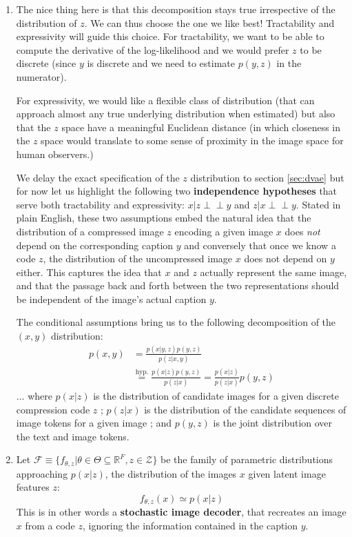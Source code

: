 \documentclass{article}
\begin{document}
\begin{multicols}{2}
\begin{enumerate}
    \item The nice thing here is that this decomposition stays true irrespective of the distribution of $z$.
    We can thus choose the one we like best!
    Tractability and expressivity will guide this choice. For tractability, we want to be able to compute the derivative of the log-likelihood and we would prefer $z$ to be discrete (since $y$ is discrete and we need to estimate $p(y,z)$ in the numerator).
    
    For expressivity, we would like a flexible class of distribution (that can approach almost any true underlying distribution when estimated) but also that the $z$ space have a meaningful Euclidean distance (in which closeness in the $z$ space would translate to some sense of proximity in the image space for human observers.)
    
    We delay the exact specification of the $z$ distribution to section \ref{sec:dvae} but for now let us highlight the following two \textbf{independence hypotheses} that serve both tractability and expressivity: $x|z \perp\!\!\!\perp y$ and $z|x \perp\!\!\!\perp y$.
    Stated in plain English, these two assumptions embed the natural idea that the distribution of a compressed image $z$ encoding a given image $x$ does \textit{not} depend on the corresponding caption $y$ and conversely that once we know a code $z$, the distribution of the uncompressed image $x$ does not depend on $y$ either.
    This captures the idea that $x$ and $z$ actually represent the same image, and that the passage back and forth between the two representations should be independent of the image's actual caption $y$.
    
    The conditional assumptions bring us to the following decomposition of the $(x,y)$ distribution:
    \begin{align*}
        p(x,y) & =\frac{p(x|y,z)p(y,z)}{p(z|x,y)} \\
        & \overset{\text{hyp.}}{=}\frac{p(x|z)p(y,z)}{p(z|x)}=\frac{p(x|z)}{p(z|x)}p(y,z)
    \end{align*}
    ... where $p(x|z)$ is the distribution of candidate images for a given discrete compression code $z$ ; $p(z|x)$ is the distribution of the candidate sequences of image tokens for a given image ; and $p(y,z)$ is the joint distribution over the text and image tokens.
    
    \item Let $\mathcal{F}\equiv\{f_{\theta,z}|\theta\in\Theta\subseteq\mathbb{R}^{F}, z\in\mathcal{Z}\}$ be the family of parametric distributions approaching $p(x|z)$, the distribution of the images $x$ given latent image features $z$:
    $$f_{\theta,z}(x) \simeq p(x |z)$$
    This is in other words a \textbf{stochastic image decoder}, that recreates an image $x$ from a code $z$, ignoring the information contained in the caption $y$.
    

\end{enumerate}
\end{multicols}
\end{document}
